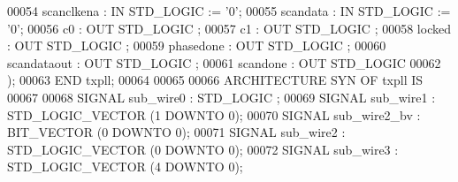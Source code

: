 \begin{DoxyCode}
{00054         \textcolor{vhdlchar}{scanclkena}      \textcolor{vhdlchar}{:} \textcolor{keywordflow}{IN} \textcolor{comment}{STD\_LOGIC}  \textcolor{vhdlchar}{:=} \textcolor{vhdlchar}{'}\textcolor{vhdllogic}{}\textcolor{vhdllogic}{0}\textcolor{vhdlchar}{'};
00055         \textcolor{vhdlchar}{scandata}        \textcolor{vhdlchar}{:} \textcolor{keywordflow}{IN} \textcolor{comment}{STD\_LOGIC}  \textcolor{vhdlchar}{:=} \textcolor{vhdlchar}{'}\textcolor{vhdllogic}{}\textcolor{vhdllogic}{0}\textcolor{vhdlchar}{'};
00056         \textcolor{vhdlchar}{c0}      \textcolor{vhdlchar}{:} \textcolor{keywordflow}{OUT} \textcolor{comment}{STD\_LOGIC} ;
00057         \textcolor{vhdlchar}{c1}      \textcolor{vhdlchar}{:} \textcolor{keywordflow}{OUT} \textcolor{comment}{STD\_LOGIC} ;
00058         locked      : \textcolor{keywordflow}{OUT} \textcolor{comment}{STD\_LOGIC} ;
00059         \textcolor{vhdlchar}{phasedone}       \textcolor{vhdlchar}{:} \textcolor{keywordflow}{OUT} \textcolor{comment}{STD\_LOGIC} ;
00060         \textcolor{vhdlchar}{scandataout}     \textcolor{vhdlchar}{:} \textcolor{keywordflow}{OUT} \textcolor{comment}{STD\_LOGIC} ;
00061         \textcolor{vhdlchar}{scandone}        \textcolor{vhdlchar}{:} \textcolor{keywordflow}{OUT} \textcolor{comment}{STD\_LOGIC} 
00062     \textcolor{vhdlchar}{)};
00063 \textcolor{keywordflow}{END} \textcolor{vhdlchar}{txpll};
00064 
00065 
00066 \textcolor{keywordflow}{ARCHITECTURE} SYN \textcolor{keywordflow}{OF} txpll IS
00067 
00068     \textcolor{keywordflow}{SIGNAL} \textcolor{vhdlchar}{sub_wire0}    \textcolor{vhdlchar}{:} \textcolor{comment}{STD\_LOGIC} ;
00069     \textcolor{keywordflow}{SIGNAL} \textcolor{vhdlchar}{sub_wire1}    \textcolor{vhdlchar}{:} \textcolor{comment}{STD\_LOGIC\_VECTOR} \textcolor{vhdlchar}{(}\textcolor{vhdllogic}{}\textcolor{vhdllogic}{1} \textcolor{keywordflow}{DOWNTO} \textcolor{vhdllogic}{}\textcolor{vhdllogic}{0}\textcolor{vhdlchar}{)};
00070     \textcolor{keywordflow}{SIGNAL} \textcolor{vhdlchar}{sub_wire2_bv} \textcolor{vhdlchar}{:} \textcolor{comment}{BIT\_VECTOR} \textcolor{vhdlchar}{(}\textcolor{vhdllogic}{}\textcolor{vhdllogic}{0} \textcolor{keywordflow}{DOWNTO} \textcolor{vhdllogic}{}\textcolor{vhdllogic}{0}\textcolor{vhdlchar}{)};
00071     \textcolor{keywordflow}{SIGNAL} \textcolor{vhdlchar}{sub_wire2}    \textcolor{vhdlchar}{:} \textcolor{comment}{STD\_LOGIC\_VECTOR} \textcolor{vhdlchar}{(}\textcolor{vhdllogic}{}\textcolor{vhdllogic}{0} \textcolor{keywordflow}{DOWNTO} \textcolor{vhdllogic}{}\textcolor{vhdllogic}{0}\textcolor{vhdlchar}{)};
00072     \textcolor{keywordflow}{SIGNAL} \textcolor{vhdlchar}{sub_wire3}    \textcolor{vhdlchar}{:} \textcolor{comment}{STD\_LOGIC\_VECTOR} \textcolor{vhdlchar}{(}\textcolor{vhdllogic}{}\textcolor{vhdllogic}{4} \textcolor{keywordflow}{DOWNTO} \textcolor{vhdllogic}{}\textcolor{vhdllogic}{0}\textcolor{vhdlchar}{)};
}
\end{DoxyCode}

